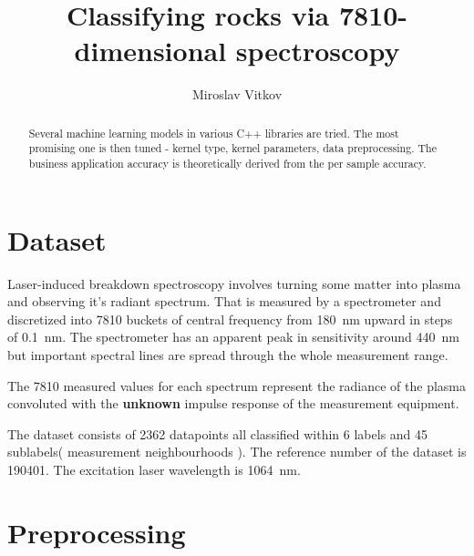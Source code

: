 \documentclass{article}
\title{Classifying rocks via 7810-dimensional spectroscopy}
\author{Miroslav Vitkov}
\begin{document}
\maketitle


\begin{abstract}
Several machine learning models in various C++ libraries are tried.
The most promising one is then tuned - kernel type, kernel parameters, data preprocessing.
The business application accuracy is theoretically derived from the per sample accuracy.
\end{abstract}


\section{Dataset}
Laser-induced breakdown spectroscopy\cite{libs_intro} involves turning some matter into plasma and observing it's radiant spectrum.
That is measured by a spectrometer and discretized into 7810 buckets of central frequency from  \SI{180}{\nano\metre} upward in steps of \SI{0.1}{\nano\metre}.
The spectrometer has an apparent peak in sensitivity around \SI{440}{\nano\metre} but important spectral lines are spread through the whole measurement range.
\par
The 7810 measured values for each spectrum represent the radiance\cite{radiance} of the plasma convoluted with the \textbf{unknown} impulse response of the measurement equipment.
\par
The dataset consists of 2362 datapoints all classified within 6 labels and 45 sublabels( measurement neighbourhoods ).
The reference number of the dataset is 190401.
The excitation laser wavelength is \SI{1064}{\nano\metre}.


\section{Preprocessing}
\end{document}
